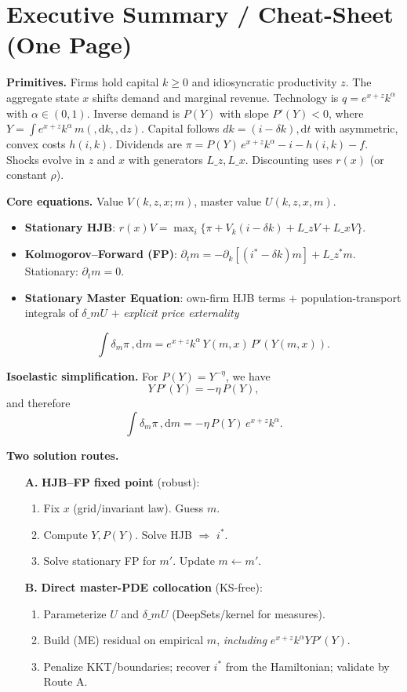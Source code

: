 \documentclass[11pt,letterpaper,oneside]{article}
\numberwithin{equation}{section}
\newcommand{\1}{\mathbf{1}}
\newcommand{\diff}{,\mathrm{d}}
\newcommand{\Lz}{L\_z}
\newcommand{\Lx}{L\_x}
\newcommand{\Lzadj}{L\_z^{\!*}}
\newcommand{\dmU}{\delta\_m U}
\begin{document}
\section*{Executive Summary / Cheat-Sheet (One Page)}
\begin{tcolorbox}[didacticstyle]
\textbf{Primitives.} Firms hold capital $k\!\ge 0$ and idiosyncratic productivity $z$. The aggregate state $x$ shifts demand and marginal revenue. Technology is $q=e^{x+z}k^\alpha$ with $\alpha\in(0,1)$. Inverse demand is $P(Y)$ with slope $P'(Y)<0$, where $Y=\int e^{x+z}k^\alpha\,m(\diff k,\diff z)$. Capital follows $dk=(i-\delta k)\diff t$ with asymmetric, convex costs $h(i,k)$. Dividends are $\pi = P(Y)\,e^{x+z}k^\alpha - i - h(i,k) - f$. Shocks evolve in $z$ and $x$ with generators $\Lz,\Lx$. Discounting uses $r(x)$ (or constant $\rho$).
\medskip

\textbf{Core equations.} Value $V(k,z,x;m)$, master value $U(k,z,x,m)$.
\begin{itemize}[leftmargin=1.25em]
\item \textbf{Stationary HJB}: $r(x)V=\max_i\{\pi+V_k(i-\delta k)+\Lz V+\Lx V\}$.
\item \textbf{Kolmogorov--Forward (FP)}: $\partial_t m=-\partial_k[(i^*-\delta k)m]+\Lzadj m$. Stationary: $\partial_t m=0$.
\item \textbf{Stationary Master Equation}: own-firm HJB terms $+$ population-transport integrals of $\dmU$ $+$ \emph{explicit price externality}

$$
\int \delta_m \pi\,\diff m = e^{x+z}k^\alpha\,Y(m,x)\,P'(Y(m,x)).
$$

\end{itemize}


\textbf{Isoelastic simplification.} For $P(Y)=Y^{-\eta}$, we have
\[
Y\,P'(Y)=-\eta\,P(Y),
\]
and therefore
\[
\int \delta_m \pi\,\diff m = -\eta\,P(Y)\,e^{x+z}k^\alpha.
\]

\textbf{Two solution routes.}
\begin{enumerate}[leftmargin=1.25em]
\item[\textbf{A.}] \textbf{HJB--FP fixed point} (robust):
\begin{enumerate}[leftmargin=1em,label*=\arabic*.]
\item Fix $x$ (grid/invariant law). Guess $m$.
\item Compute $Y,P(Y)$. Solve HJB $\Rightarrow$ $i^*$.
\item Solve stationary FP for $m'$. Update $m\leftarrow m'$.
\end{enumerate}
\item[\textbf{B.}] \textbf{Direct master-PDE collocation} (KS-free):
\begin{enumerate}[leftmargin=1em,label*=\arabic*.]
\item Parameterize $U$ and $\dmU$ (DeepSets/kernel for measures).
\item Build (ME) residual on empirical $m$, \emph{including} $e^{x+z}k^\alpha Y P'(Y)$.
\item Penalize KKT/boundaries; recover $i^*$ from the Hamiltonian; validate by Route A.
\end{enumerate}
\end{enumerate}


\end{tcolorbox}
\end{document}
